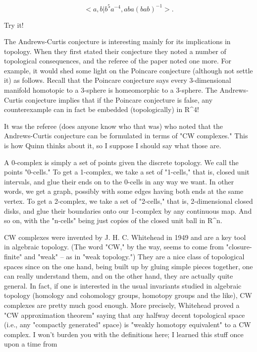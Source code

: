 $$

<a, b|b^5a^{-4}, aba(bab)^{-1}>.
$$
    

Try it!

The Andrews-Curtis conjecture is interesting mainly for its implications
in topology.  When they first stated their conjecture they noted a
number of topological consequences, and the referee of the paper noted
one more.  For example, it would shed some light on the Poincare
conjecture (although not settle it) as follows.  Recall that the
Poincare conjecture says every 3-dimensional manifold homotopic to a
3-sphere is homeomorphic to a 3-sphere.  The Andrews-Curtis conjecture
implies that if the Poincare conjecture is false, any counterexample can
in fact be embedded (topologically) in R^4!

It was the referee (does anyone know who that was) who noted that 
the Andrews-Curtis conjecture can be formulated in terms of
"CW complexes."  This is how Quinn thinks about it, so I suppose I
should say what those are.   

A 0-complex is simply a set of points given the discrete topology.  We
call the points "0-cells."   To get a 1-complex, we take a set of
"1-cells," that is, closed unit intervals, and glue their ends on to the
0-cells in any way we want.  In other words, we get a graph, possibly
with some edges having both ends at the same vertex.  To get a
2-complex, we take a set of "2-cells," that is, 2-dimensional closed
disks, and glue their boundaries onto our 1-complex by any continuous
map.  And so on, with the "n-cells" being just copies of the closed unit
ball in R^n. 

CW complexes were invented by J. H. C. Whitehead in 1949 and are a key tool
in algebraic topology.  (The word "CW," by the way, seems to come from
"closure-finite" and "weak" -- as in "weak topology.")  They are a
nice class of topological spaces since on the one hand, being built up
by gluing simple pieces together, one can really understand them, and on
the other hand, they are actually quite general.  In fact, if one is
interested in the usual invariants studied in algebraic topology
(homology and cohomology groups, homotopy groups and the like), CW
complexes are pretty much good enough. More precisely, Whitehead proved
a "CW approximation theorem" saying that any halfway decent topological
space (i.e., any "compactly generated" space) is "weakly homotopy
equivalent" to a CW complex.  I won't burden you with the definitions
here; I learned this stuff once upon a time from 

